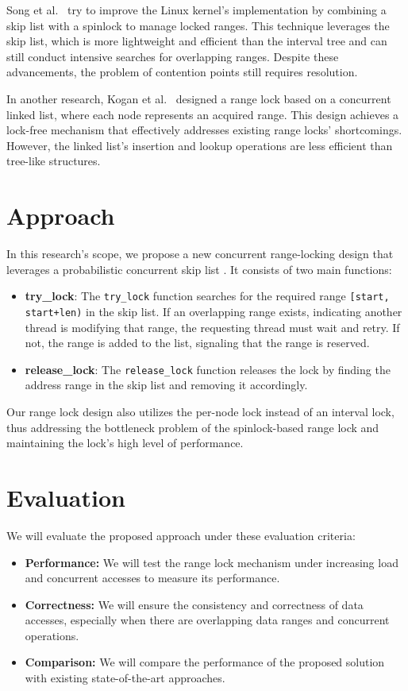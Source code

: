 Song et al.~\parencite{song2013parallelizing} try to improve the Linux kernel's implementation by combining a skip list with a spinlock to manage locked ranges. This technique leverages the skip list, which is more lightweight and efficient than the interval tree and can still conduct intensive searches for overlapping ranges. Despite these advancements, the problem of contention points still requires resolution.

In another research, Kogan et al.~\cite{kogan2020scalable} designed a range lock based on a concurrent linked list, where each node represents an acquired range. This design achieves a lock-free mechanism that effectively addresses existing range locks' shortcomings. However, the linked list's insertion and lookup operations are less efficient than tree-like structures.

\section{Approach}
In this research's scope, we propose a new concurrent range-locking design that leverages a probabilistic concurrent skip list \parencite{herlihy2006provably, herlihy2020art}. It consists of two main functions:
\begin{itemize}
    \item \textbf{try\_lock}: The \texttt{try\_lock} function searches for the required range \texttt{[start, start+len)} in the skip list. If an overlapping range exists, indicating another thread is modifying that range, the requesting thread must wait and retry. If not, the range is added to the list, signaling that the range is reserved.
    \item \textbf{release\_lock}: The \texttt{release\_lock} function releases the lock by finding the address range in the skip list and removing it accordingly.
\end{itemize} 

Our range lock design also utilizes the per-node lock instead of an interval lock, thus addressing the bottleneck problem of the spinlock-based range lock and maintaining the lock's high level of performance. 

\section{Evaluation}
We will evaluate the proposed approach under these evaluation criteria:
\begin{itemize}
    \item \textbf{Performance:} We will test the range lock mechanism under increasing load and concurrent accesses to measure its performance.
    \item \textbf{Correctness:} We will ensure the consistency and correctness of data accesses, especially when there are overlapping data ranges and concurrent operations.
    \item \textbf{Comparison:} We will compare the performance of the proposed solution with existing state-of-the-art approaches.
\end{itemize}

